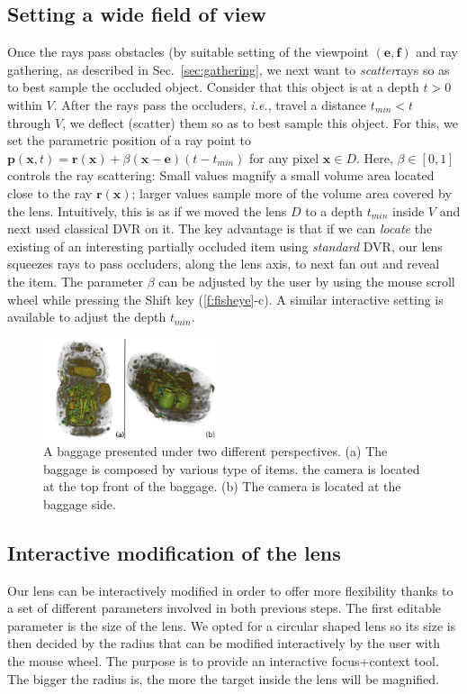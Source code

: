\subsection{Setting a wide field of view}
%
Once the rays pass obstacles (by suitable setting of the viewpoint $(\mathbf{e},\mathbf{f})$ and ray gathering, as described in Sec.~\ref{sec:gathering}, we next want to \emph{scatter}rays so as to best sample the occluded object. Consider that this object is at a depth $t>0$ within $V$. After the rays pass the occluders, \emph{i.e.}, travel a distance $t_{min} < t$ through $V$, we deflect (scatter) them so as to best sample this object. For this, we set the parametric position of a ray point to $\mathbf{p}(\mathbf{x}, t) = \mathbf{r}(\mathbf{x}) + \beta (\mathbf{x} - \mathbf{e})(t-t_{min})$ for any pixel $\mathbf{x} \in D$. Here, $\beta \in [0,1]$ controls the ray scattering: Small values magnify a small volume area located close to the ray $\mathbf{r}(\mathbf{x})$; larger values sample more of the volume area covered by the lens. Intuitively, this is as if we moved the lens $D$ to a depth $t_{min}$ inside $V$ and next used classical DVR on it. The key advantage is that if we can \emph{locate} the existing of an interesting partially occluded item using \emph{standard} DVR, our lens squeezes rays to pass occluders, along the lens axis, to next fan out and reveal the item. The parameter $\beta$ can be adjusted by the user by using the mouse scroll wheel while pressing the Shift key (\autoref{f:fisheye}-c). A similar interactive setting is available to adjust the depth $t_{min}$.
%
%
\begin{figure} 
\includegraphics [width=0.45\textwidth]{images/bagage_orientation_bis.pdf} 
\caption{ A baggage presented under two different perspectives. (a) The baggage is composed by various type of items. the camera is located at the top front of the baggage. (b) The camera is located at the baggage side.  }
\label{f:baggage_orientation}
\end{figure}

\subsection{Interactive modification of the lens}
Our lens can be interactively modified in order to offer more flexibility thanks to a set of different parameters involved in both previous steps. The first editable parameter is the size of the lens. We opted for a circular shaped lens so its size is then decided by the radius that can be modified interactively by the user with the mouse wheel. The purpose is to provide an interactive focus+context tool. The bigger the radius is, the more the target inside the lens will be magnified. 

